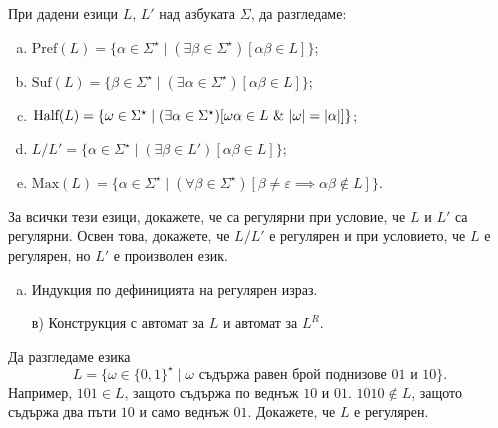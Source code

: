 \begin{problem}
  При дадени езици $L$, $L'$ над азбуката $\Sigma$, да разгледаме:
  \begin{enumerate}[a)]
  \item
    $\mbox{Pref}(L) = \{\alpha \in \Sigma^\star \mid (\exists \beta \in \Sigma^\star)[\alpha\beta \in L]\}$;
  \item
    $\mbox{Suf}(L) = \{\beta \in \Sigma^\star \mid (\exists \alpha \in \Sigma^\star)[\alpha\beta \in L]\}$;
  \item 
    $\mbox{Half}(L) = \{\omega \in \Sigma^\star \mid (\exists \alpha \in \Sigma^\star)[\omega\alpha \in L\ \&\ \abs{\omega} = \abs{\alpha}]\}$;
  \item
    $L/L' = \{\alpha \in \Sigma^\star \mid (\exists \beta \in L')[\alpha\beta \in L]\}$;
  \item
    $\mbox{Max}(L) = \{\alpha \in \Sigma^\star \mid (\forall \beta\in\Sigma^\star)[\beta \neq \varepsilon\implies \alpha\beta \not\in L]\}$.
  \end{enumerate}
  За всички тези езици, докажете, че са регулярни при условие, че $L$ и $L'$ са регулярни.
  Освен това, докажете, че $L/L'$ е регулярен и при условието, че $L$ е регулярен, но $L'$ е произволен език.
\end{problem}
\begin{hint}
  \begin{enumerate}[a)]
  \item 
    Индукция по дефиницията на регулярен израз.
  \item[в)]
    Конструкция с автомат за $L$ и автомат за $L^R$.
  \end{enumerate}
\end{hint}


\begin{problem}
  Да разгледаме езика
  \[L = \{\omega \in \{0,1\}^\star \mid \omega\text{ съдържа равен брой поднизове }01\text{ и }10\}.\]
  Например, $101 \in L$, защото съдържа по веднъж $10$ и $01$.
  $1010 \not\in  L$, защото съдържа два пъти $10$ и само веднъж $01$.
  Докажете, че $L$ е регулярен.
\end{problem}

